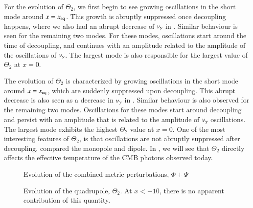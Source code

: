 For the evolution of $\Theta_2$, we first begin to see growing oscillations in the short mode around $x=x_\mathrm{eq}$. This growth is abruptly suppressed once decoupling happens, where we also had an abrupt decrease of $v_\gamma$ in . Similar behaviour is seen for the remaining two modes. For these modes, oscillations start around the time of decoupling, and continues with an amplitude related to the amplitude of the oscillations of $v_\gamma$. The largest mode is also responsible for the largest value of $\Theta_2$ at $x=0$. 

The evolution of $\Theta_2$ is characterized by growing oscillations in the short mode around $x=x_\mathrm{eq}$, which are suddenly suppressed upon decoupling. This abrupt decrease is also seen as a decrease in $v_\gamma$ in . Similar behaviour is also observed for the remaining two modes. Oscillations for these modes start around decoupling and persist with an amplitude that is related to the amplitude of $v_\gamma$ oscillations. The largest mode exhibits the highest $\Theta_2$ value at $x=0$. One of the most interesting features of $\Theta_2$, is that oscillations are not abruptly suppressed after decoupling, compared the monopole and dipole. In , we will see that $\Theta_2$ directly affects the effective temperature of the CMB photons observed today.   

\begin{figure}[ht!]
    \caption{Evolution of the combined metric perturbations, $\Phi+\Psi$}
    \label{fig:M3:results:Phi_plus_Psi}
\end{figure}

  
\begin{figure}[ht!]
    \caption{Evolution of the quadrupole, $\Theta_2$. At $x<-10$, there is no apparent contribution of this quantity.}
    \label{fig:M3:results:Theta2}
\end{figure}
